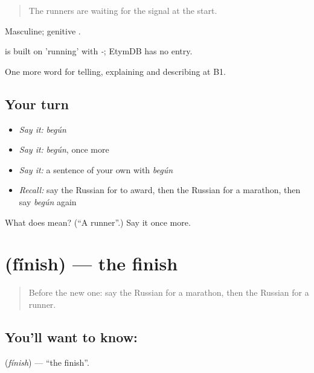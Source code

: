\begin{quote}
The runners are waiting for the signal at the start.
\end{quote}

Masculine; genitive .

\begin{cousinweb}
\emph{} is built on \emph{} 'running' with \emph{-}; EtymDB has no entry.
\end{cousinweb}

\begin{grammarlens}[title={What you've built}]
One more word for telling, explaining and describing at B1.
\end{grammarlens}

\subsection*{Your turn}
\begin{itemize}
\raggedright
  \item \emph{Say it:} \emph{begún}
  \item \emph{Say it:} \emph{begún}, once more
  \item \emph{Say it:} a sentence of your own with \emph{begún}
  \item \emph{Recall:} say the Russian for to award, then the Russian for a marathon, then say \emph{begún} again
\end{itemize}

\begin{tcolorbox}[breakable,colback=teal!4,colframe=teal!35!black,title={Before you move on}]
What does  mean? (\textquotedblleft{}A runner\textquotedblright{}.) Say it once more.
\end{tcolorbox}
\section[\texorpdfstring{\ru{финиш} (fínish)}{финиш (fínish)}]{ (fínish) — the finish}

\label{lesson:RU-C512-finish}



\begin{quote}
Before the new one: say the Russian for a marathon, then the Russian for a runner.
\end{quote}

\subsection*{You'll want to know: }
\textbf{} (\emph{fínish}) — \textquotedblleft{}the finish\textquotedblright{}.

